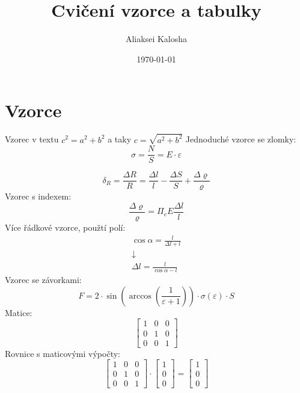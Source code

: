 \documentclass[11pt,a4paper]{article}
\title{Cvičení vzorce a tabulky}
\author{Aliaksei Kalosha}
\date{\today}
\begin{document}
\maketitle

\section{Vzorce}

Vzorec v textu $c^2 = a^2 + b^2$ a taky $c = \sqrt{a^2+b^2}$
Jednoduché vzorce se zlomky:
\begin{equation}
    \sigma = \frac{N}{S} = E \cdot \varepsilon
\end{equation}

\begin{equation}
    \delta_{R} = \frac{\Delta R}{R} = \frac{\Delta l}{l} - \frac{\Delta S}{S} + \frac{\Delta \varrho}{\varrho}
\end{equation}
Vzorec s indexem:
\begin{equation}
    \frac{\Delta \varrho}{\varrho} = \Pi_{e}E\frac{\Delta l}{l}
\end{equation}
Více řádkové vzorce, použtí polí:
\begin{equation}
    \begin{gathered}
        \cos{\alpha} = \frac{l}{\Delta l+l}\\
        \downarrow\\
        \Delta l =\frac{l}{\cos{\alpha} - l}
    \end{gathered}
\end{equation}
Vzorec se závorkami:
\begin{equation}
    F = 2 \cdot \sin{ \left( \arccos{ \left( \frac{1}{\varepsilon + 1} \right) }\right)}  \cdot \sigma(\varepsilon) \cdot S
\end{equation}
Matice:
\begin{equation}
    \begin{bmatrix}
    1 & 0 & 0\\
    0 & 1 & 0\\
    0 & 0 & 1
    \end{bmatrix}
\end{equation}
Rovnice s maticovými výpočty:
\begin{equation}
    \begin{bmatrix}
        1 & 0 & 0\\
        0 & 1 & 0\\
        0 & 0 & 1
    \end{bmatrix}
    \cdot
    \begin{bmatrix}
        1 \\
        0 \\
        0 
    \end{bmatrix}
    =
    \begin{bmatrix}
        1\\
        0\\
        0 
    \end{bmatrix}
\end{equation}
\newpage
\end{document}

